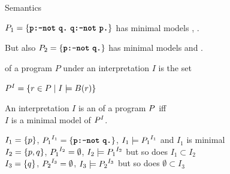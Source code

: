 \documentclass{beamer}
\begin{document}
\begin{frame}{Semantics}
	\onslide<+->
	
	$\prog_1 = \set{\code{p:-not}\ \code{q.}\ \code{q:-not}\ \code{p.}}$
	has minimal models , .
	
	But also $\prog_2 = \set{\code{p:-not}\ \code{q.}}$
	has minimal models  and {\color{red}}.
	
	\onslide<+->
	
	\begin{definition}
		 of a program $P$ under an interpretation $I$ is the set
		\begin{center}
			$\activerules{I}{\prog} = \setcomp{r \in \prog}{I \models \body{r}}$
		\end{center}
	\end{definition}
	
	\begin{definition}
		An interpretation $I$ is an  of a program $\prog$ iff\\
		$I$ is a minimal model of $\activerules{I}{\prog}$.
	\end{definition}
	
	\onslide<+->
	
	\begin{example}
		$I_1 = \set{p}$, $\activerules{I_1}{\prog_1} = \set{\code{p:-not}\ \code{q.}}$, $I_1\models\activerules{I_1}{\prog_1}$ and $I_1$ is minimal\\
		\onslide<+->
		$I_2 = \set{p,q}$, $\activerules{I_2}{\prog_1} = \emptyset$, $I_2\models\activerules{I_2}{\prog_1}$ but so does $I_1 \subset I_2$\\
		\onslide<+->
		$I_3 = \set{q}$, $\activerules{I_3}{\prog_2} = \emptyset$, $I_3\models\activerules{I_3}{\prog_2}$ but so does $\emptyset \subset I_3$
	\end{example}
	
\end{frame}
\end{document}

